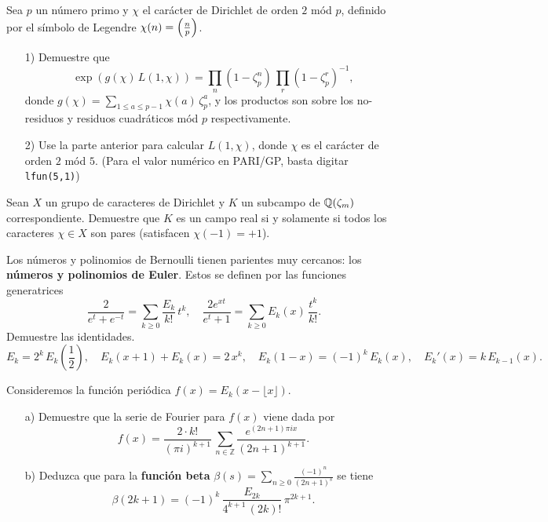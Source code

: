 \begin{ejercicio}
  \label{ejerc:L-series-caracter-cuadratico-mod-p}
  Sea $p$ un número primo y $\chi$ el carácter de Dirichlet de orden $2$ mód
  $p$, definido por el símbolo de Legendre $\chi (n) = \left(\frac{n}{p}\right)$.

  \begin{enumerate}
  \item[1)] Demuestre que
    $$\exp (g (\chi)\,L (1,\chi)) = \prod_n (1 - \zeta_p^n)\,\prod_r (1 - \zeta_p^r)^{-1},$$
    donde $g (\chi) = \sum_{1 \le a
      \le p-1} \chi (a)\,\zeta_p^a$, y los productos son sobre los no-residuos y
    residuos cuadráticos mód $p$ respectivamente.

  \item[2)] Use la parte anterior para calcular $L (1,\chi)$, donde $\chi$ es el
    carácter de orden $2$ mód $5$.  (Para el valor numérico en PARI/GP, basta
    digitar \texttt{lfun(5,1)})
  \end{enumerate}
\end{ejercicio}

\begin{ejercicio}
  Sean $X$ un grupo de caracteres de Dirichlet y $K$ un subcampo de
  $\mathbb{Q} (\zeta_m)$ correspondiente. Demuestre que $K$ es un campo real si y
  solamente si todos los caracteres $\chi \in X$ son pares (satisfacen
  $\chi (-1) = +1$).
\end{ejercicio}

\begin{ejercicio}
  Los números y polinomios de Bernoulli tienen parientes muy cercanos:
  los \textbf{números y polinomios de Euler}. Estos se definen por las funciones
  generatrices
  \[ \frac{2}{e^t + e^{-t}} = \sum_{k \ge 0} \frac{E_k}{k!} \, t^k, \quad
     \frac{2 e^{xt}}{e^t + 1} = \sum_{k \ge 0} E_k (x)\,\frac{t^k}{k!}. \]
  Demuestre las identidades.
  \[ E_k = 2^k \, E_k \left(\frac{1}{2}\right), \quad
     E_k (x+1) + E_k (x) = 2\,x^k, \quad
     E_k (1-x) = (-1)^k\,E_k (x), \quad
     E_k' (x) = k\,E_{k-1} (x). \]
\end{ejercicio}

\begin{ejercicio}[Continuación]
  Consideremos la función periódica $f (x) = E_k (x - \lfloor x\rfloor)$.

  \begin{enumerate}
  \item[a)] Demuestre que la serie de Fourier para $f (x)$ viene dada por
    $$f (x) = \frac{2\cdot k!}{(\pi i)^{k+1}}\,\sum_{n\in \mathbb{Z}} \frac{e^{(2n+1)\pi i x}}{(2n+1)^{k+1}}.$$
  \item[b)] Deduzca que para la \textbf{función beta}
    $\beta (s) = \sum_{n \ge 0} \frac{(-1)^n}{(2n+1)^s}$ se tiene
    $$\beta (2k+1) = (-1)^k\,\frac{E_{2k}}{4^{k+1}\,(2k)!}\,\pi^{2k+1}.$$
  \end{enumerate}
\end{ejercicio}

